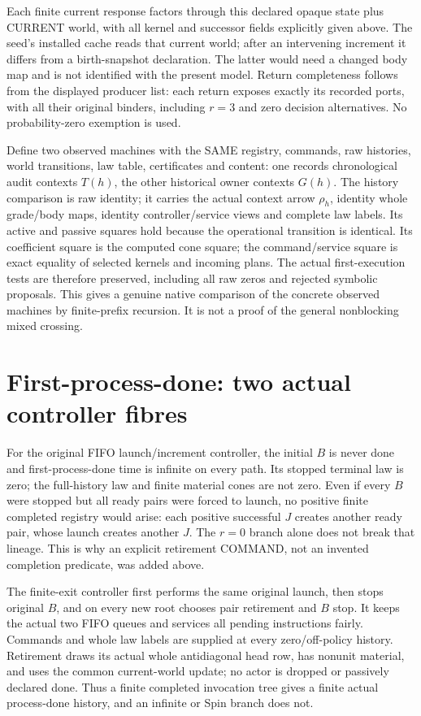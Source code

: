 \documentclass[11pt]{article}
\begin{document}
Each finite current response factors through this declared opaque state plus CURRENT world, with all kernel and successor fields explicitly given above. The seed's installed cache reads that current world; after an intervening increment it differs from a birth-snapshot declaration. The latter would need a changed body map and is not identified with the present model. Return completeness follows from the displayed producer list: each return exposes exactly its recorded ports, with all their original binders, including $r=3$ and zero decision alternatives. No probability-zero exemption is used.

Define two observed machines with the SAME registry, commands, raw histories, world transitions, law table, certificates and content: one records chronological audit contexts $T(h)$, the other historical owner contexts $G(h)$. The history comparison is raw identity; it carries the actual context arrow $\rho_h$, identity whole grade/body maps, identity controller/service views and complete law labels. Its active and passive squares hold because the operational transition is identical. Its coefficient square is the computed cone square; the command/service square is exact equality of selected kernels and incoming plans. The actual first-execution tests are therefore preserved, including all raw zeros and rejected symbolic proposals. This gives a genuine native comparison of the concrete observed machines by finite-prefix recursion. It is not a proof of the general nonblocking mixed crossing.

\section{First-process-done: two actual controller fibres}
For the original FIFO launch/increment controller, the initial $B$ is never done and first-process-done time is infinite on every path. Its stopped terminal law is zero; the full-history law and finite material cones are not zero. Even if every $B$ were stopped but all ready pairs were forced to launch, no positive finite completed registry would arise: each positive successful $J$ creates another ready pair, whose launch creates another $J$. The $r=0$ branch alone does not break that lineage. This is why an explicit retirement COMMAND, not an invented completion predicate, was added above.

The finite-exit controller first performs the same original launch, then stops original $B$, and on every new root chooses pair retirement and $B$ stop. It keeps the actual two FIFO queues and services all pending instructions fairly. Commands and whole law labels are supplied at every zero/off-policy history. Retirement draws its actual whole antidiagonal head row, has nonunit material, and uses the common current-world update; no actor is dropped or passively declared done. Thus a finite completed invocation tree gives a finite actual process-done history, and an infinite or Spin branch does not.
\end{document}
